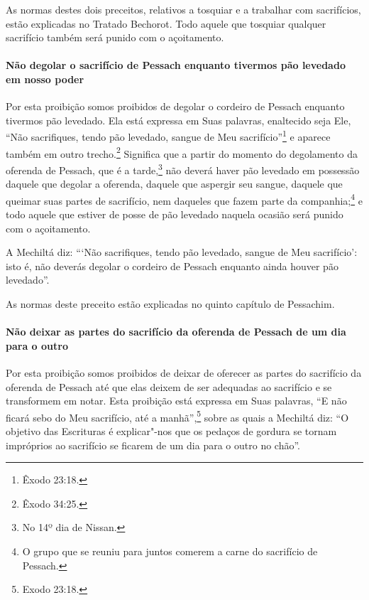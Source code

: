 \begin{multicols}{2}
As normas destes dois preceitos, relativos a tosquiar e a trabalhar com
sacrifícios, estão explicadas no Tratado Bechorot\starr. Todo aquele que
tosquiar qualquer sacrifício também será punido com o açoitamento.

\paragraph{Não degolar o sacrifício de Pessach\starr{} enquanto tivermos pão
levedado em nosso poder}

Por esta proibição somos proibidos de degolar o cordeiro de Pessach\starr{}
enquanto tivermos pão levedado. Ela está expressa em Suas palavras,
enaltecido seja Ele, ``Não sacrifiques, tendo pão levedado, sangue de
Meu sacrifício''\footnote{Êxodo 23:18.} e aparece também em outro
trecho.\footnote{Êxodo 34:25.} Significa que a partir do momento do
degolamento da oferenda de Pessach\starr, que é a
tarde,\footnote{No 14º dia de Nissan\starr.} não deverá haver pão levedado em possessão
daquele que degolar a oferenda, daquele que aspergir seu sangue, daquele
que queimar suas partes de sacrifício, nem daqueles que fazem parte da
companhia;\footnote{O grupo que se reuniu para juntos comerem a carne do sacrifício de
  Pessach\starr.} e todo aquele que estiver de posse de
pão levedado naquela ocasião será punido com o açoitamento.

A Mechiltá\starr{} diz: ```Não sacrifiques, tendo pão levedado, sangue de Meu
sacrifício': isto é, não deverás degolar o cordeiro de Pessach\starr{}
enquanto ainda houver pão levedado''.

As normas deste preceito estão explicadas no quinto capítulo de
Pessachim\starr.

\paragraph{Não deixar as partes do sacrifício da oferenda de Pessach\starr{} de um dia
para o outro}

Por esta proibição somos proibidos de deixar de oferecer as partes do
sacrifício da oferenda de Pessach\starr{} até que elas deixem de ser
adequadas ao sacrifício e se transformem em notar\starr. Esta proibição
está expressa em Suas palavras, ``E não ficará sebo do Meu sacrifício,
até a manhã'',\footnote{Exodo 23:18.} sobre as quais a Mechiltá\starr{} diz: ``O objetivo
das Escrituras é explicar"-nos que os pedaços de gordura se tornam
impróprios ao sacrifício se ficarem de um dia para o outro no chão''.


\end{multicols}
